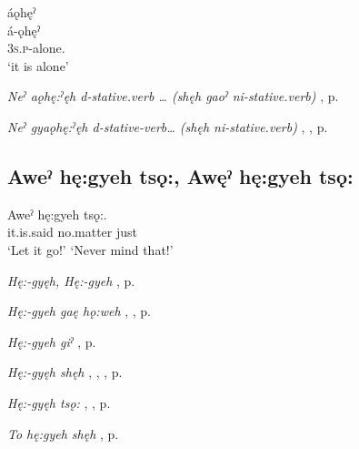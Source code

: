 \ea
\label{ex:apart14}
áǫhęˀ\\
\gll á-ǫhęˀ\\
\textsc{3s.p}-alone.{\stative}\\
\glt ‘it is alone’
\z

\begin{CayugaRelated}
\item \textit{Neˀ aǫhę:ˀęh d-stative.verb … (shęh gaoˀ ni-stative.verb)} , p. \pageref{p:[neˀ aǫhę:ˀęh d-]}\\
\item \textit{Neˀ gyaǫhę:ˀęh d-stative-verb… (shęh ni-stative.verb)} , , p. \pageref{p:[neˀ gyaǫhę:ˀęh d-]}
\end{CayugaRelated}

\subsection*{\textbf{Aweˀ hę:gyeh tsǫ:, Awęˀ hę:gyeh tsǫ:} } \label{p:[aweˀ hę:gyeh tsǫ:]}

\ea
\label{ex:apart15}
\gll Aweˀ hę:gyeh tsǫ:.\\
it.is.said no.matter just\\
\glt ‘Let it go!’ `Never mind that!’
\z

\begin{CayugaRelated}
\item \textit{Hę:-gyęh, Hę:-gyeh} , p. \pageref{p:[hę:-gyęh]}\\
\item \textit{Hę:-gyeh gaę hǫ:weh} , , p. \pageref{p:[hę:-gyeh gaę hǫ:weh]}\\
\item \textit{Hę:-gyeh giˀ} , p. \pageref{p:[hę:-gyeh giˀ]}\\
\item \textit{Hę:-gyęh shęh} , , , p. \pageref{p:[hę:-gyęh shęh]}\\
\item \textit{Hę:-gyęh tsǫ:} , , p. \pageref{p:[hę:-gyęh tsǫ:]}\\
\item \textit{To hę:gyeh shęh} , p. \pageref{p:[to hę:gyeh shęh]}
\end{CayugaRelated}

